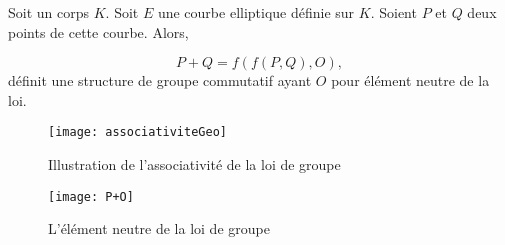 \begin{theoreme}
    Soit un corps $K$. Soit $E$ une courbe elliptique définie sur $K$. Soient $P$ et $Q$ deux
    points de cette courbe. Alors, 

    \[
    P + Q = f(f(P,Q),O)
    ,\] 
    définit une structure de groupe commutatif ayant $O$ pour élément neutre
    de la loi.
\end{theoreme}

\begin{figure}[h]
    \centering
    \texttt{[image: associativiteGeo]}
    \caption{Illustration de l'associativité de la loi de groupe}
    \label{fig:associativiteGeo}
\end{figure}

\begin{figure}[h]
    \centering
    \texttt{[image: P+O]}
    \caption{L'élément neutre de la loi de groupe}
    \label{fig:P-O}
\end{figure}


